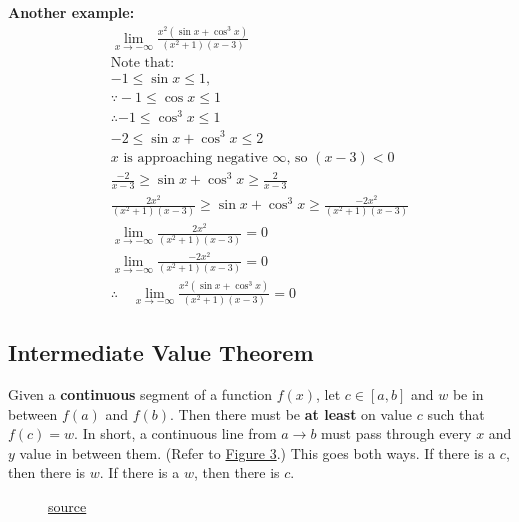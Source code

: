 \documentclass[12pt]{article}
\begin{document}
\noindent \textbf{Another example:}
\begin{gather*}
	\lim_{x \to -\infty} \frac{x^2(\sin{x} + \cos^{3}{x})}{(x^2+1)(x-3)} \\[8pt]
	\text{Note that:} \\
	-1 \le \sin{x} \le 1, \\
	\because -1 \le \cos{x} \le {1} \\
	\therefore -1 \le \cos^{3}{x} \le 1 \\
	-2 \le \sin{x} + \cos^{3}{x} \le 2 \\[8pt]
	\text{$x$ is approaching negative $\infty$, so $(x-3) < 0$} \\
	\frac{-2}{x-3} \ge \sin{x} + \cos^{3}{x} \ge \frac{2}{x-3} \\[6pt]
	\frac{2x^2}{(x^2+1)(x-3)} \ge \sin{x} + \cos^{3}{x} \ge \frac{-2x^2}{(x^2+1)(x-3)} \\[10pt]
	\lim_{x \to -\infty}\frac{2x^2}{(x^2+1)(x-3)} = 0 \\[6pt]
	\lim_{x \to -\infty}\frac{-2x^2}{(x^2+1)(x-3)} = 0 \\[6pt]
	\therefore \quad \lim_{x \to -\infty} \frac{x^2(\sin{x} + \cos^{3}{x})}{(x^2+1)(x-3)} = 0
\end{gather*}

\subsection{Intermediate Value Theorem}
Given a \textbf{continuous} segment of a function $f(x)$, let $c \in [a, b]$ and $w$ be in between $f(a)$ and $f(b)$. Then there must be \textbf{at least} on value $c$ such that $f(c) = w$. In short, a continuous line from $a \to b$ must pass through every $x$ and $y$ value in between them. (Refer to \hyperref[fig:intvaltheorem]{Figure 3}.) This goes both ways. If there is a $c$, then there is  $w$. If there is a $w$, then there is $c$.

\begin{figure}[H]
	\begin{center}
		\caption{\href{https://www.mathsisfun.com/algebra/intermediate-value-theorem.html}{source}}
		\label{fig:intvaltheorem}
	\end{center}
\end{figure}
\end{document}
